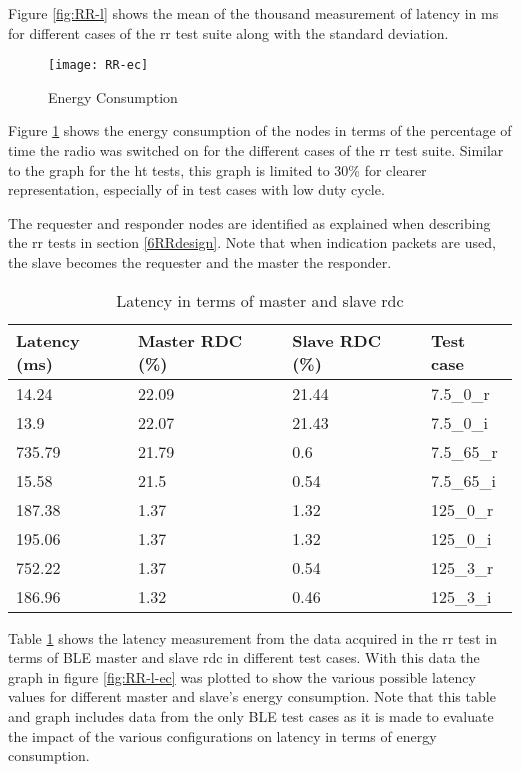 Figure \ref{fig:RR-l} shows the mean of the thousand measurement of latency in ms for different cases of the \gls{rr} test suite along with the standard deviation. 

\begin{figure}[h]
\texttt{[image: RR-ec]}
\caption{Energy Consumption}
\label{fig:RR-ec}
\end{figure}

Figure \ref{fig:RR-ec} shows the energy consumption of the nodes in terms of the percentage of time the radio was switched on for the different cases of the \gls{rr} test suite. Similar to the graph for the \gls{ht} tests, this graph is limited to 30\% for clearer representation, especially of in test cases with low duty cycle.

The requester and responder nodes are identified as explained when describing the \gls{rr} tests in section \ref{6RRdesign}. Note that when indication packets are used, the slave becomes the requester and the master the responder.

\begin{table}[h]
\centering
\setlength{\extrarowheight}{1.5pt}
\begin{tabular}[c]{|l|l|l|l|}
\hline
Latency (ms) & Master RDC (\%) & Slave RDC (\%) & Test case \\ \hline
14.24 & 22.09 & 21.44 & 7.5\_0\_r \\ \hline
13.9 & 22.07 & 21.43 & 7.5\_0\_i \\ \hline
735.79 & 21.79 & 0.6 & 7.5\_65\_r \\ \hline
15.58 & 21.5 & 0.54 & 7.5\_65\_i \\ \hline
187.38 & 1.37 & 1.32 & 125\_0\_r \\ \hline
195.06 & 1.37 & 1.32 & 125\_0\_i \\ \hline
752.22 & 1.37 & 0.54 & 125\_3\_r \\ \hline
186.96 & 1.32 & 0.46 & 125\_3\_i \\ \hline
\end{tabular}
\caption{Latency in terms of master and slave \gls{rdc}}
\label{tbl:latVsEnergy}
\end{table}

Table \ref{tbl:latVsEnergy} shows the latency measurement from the data acquired in the \gls{rr} test in terms of BLE master and slave \gls{rdc} in different test cases. With this data the graph in figure \ref{fig:RR-l-ec} was plotted to show the various possible latency values for different master and slave's energy consumption. Note that this table and graph includes data from the only BLE test cases as it is made to evaluate the impact of the various configurations on latency in terms of energy consumption.

